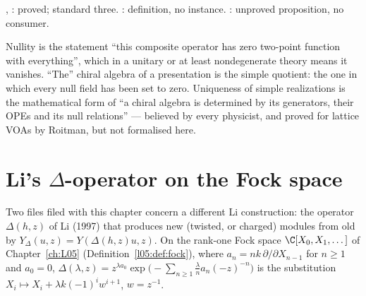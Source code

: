 \begin{status}
\allowbreak{}\allowbreak{}\allowbreak{}, \allowbreak{}\allowbreak{}\allowbreak{}: proved; standard three. : definition, no
instance. \allowbreak{}\allowbreak{}: unproved proposition, no consumer.
\end{status}

\begin{physics}
Nullity is the statement ``this composite operator has zero two-point function with everything'', which in a unitary or at least
nondegenerate theory means it vanishes. ``The'' chiral algebra of a presentation is the simple quotient: the one in which every null
field has been set to zero. Uniqueness of simple realizations is the mathematical form of ``a chiral algebra is determined by its
generators, their OPEs and its null relations'' --- believed by every physicist, and proved for lattice VOAs by Roitman, but not
formalised here.
\end{physics}

\section{Li's \texorpdfstring{$\Delta$}{Delta}-operator on the Fock space}\label{l11:sec:lidelta}

Two files filed with this chapter concern a different Li construction: the operator $\Delta(h,z)$ of Li (1997) that produces new
(twisted, or charged) modules from old by $Y_\Delta(u,z) = Y(\Delta(h,z)u,z)$. On the rank-one Fock space $\C[X_0,X_1,\dots]$ of
Chapter~\ref{ch:L05} (Definition~\ref{l05:def:fock}), where $a_n = nk\,\partial/\partial X_{n-1}$ for $n\ge1$ and $a_0 = 0$,
$\Delta(\lambda,z) = z^{\lambda a_0}\exp\bigl(-\sum_{n\ge1}\frac\lambda na_n(-z)^{-n}\bigr)$ is the substitution
$X_i\mapsto X_i+\lambda k(-1)^iw^{i+1}$, $w = z^{-1}$.


